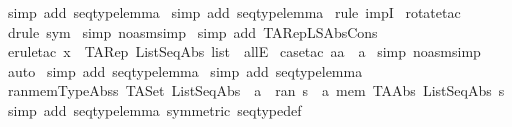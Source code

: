 \begin{isabellebody}
\ {\isacharparenleft}simp\ add{\isacharcolon}\ seqtype{\isacharunderscore}lemma{\isacharparenright}\isanewline
{}\isamarkupfalse%
\ {\isacharparenleft}simp\ add{\isacharcolon}\ seqtype{\isacharunderscore}lemma{\isacharparenright}\isanewline
{}\isamarkupfalse%
\ {\isacharparenleft}rule\ impI{\isacharparenright}\isanewline
{}\isamarkupfalse%
\ {\isacharparenleft}rotate{\isacharunderscore}tac\ {\isacharminus}{}{\isacharparenright}\isanewline
{}\isamarkupfalse%
\ {\isacharparenleft}drule\ sym{\isacharparenright}\isanewline
{}\isamarkupfalse%
\ {\isacharparenleft}simp\ {\isacharparenleft}no{\isacharunderscore}asm{\isacharunderscore}simp{\isacharparenright}{\isacharparenright}\isanewline
{}\isamarkupfalse%
\ {\isacharparenleft}simp\ add{\isacharcolon}\ TARep{\isacharunderscore}LSAbs{\isacharunderscore}Cons{\isacharparenright}\isanewline
{}\isamarkupfalse%
\ {\isacharparenleft}erule{\isacharunderscore}tac\ x\ {\isacharequal}\ {\isachardoublequoteopen}TARep\ ListSeqAbs\ list{\isachardoublequoteclose}\ \ allE{\isacharparenright}\isanewline
{}\isamarkupfalse%
\ {\isacharparenleft}case{\isacharunderscore}tac\ {\isachardoublequoteopen}aa\ {\isacharequal}\ a{\isachardoublequoteclose}{\isacharparenright}\isanewline
{}\isamarkupfalse%
\ {\isacharparenleft}simp\ {\isacharparenleft}no{\isacharunderscore}asm{\isacharunderscore}simp{\isacharparenright}{\isacharparenright}\isanewline
{}\isamarkupfalse%
\ auto\isanewline
{}\isamarkupfalse%
\ {\isacharparenleft}simp\ add{\isacharcolon}\ seqtype{\isacharunderscore}lemma{\isacharparenright}\isanewline
{}\isamarkupfalse%
\ {\isacharparenleft}simp\ add{\isacharcolon}\ seqtype{\isacharunderscore}lemma{\isacharparenright}\isanewline
{}\isamarkupfalse%
%
\endisatagproof
{\isafoldproof}%
%
\isadelimproof
\isanewline
%
\endisadelimproof
\isanewline
{}\isamarkupfalse%
\ ran{\isacharunderscore}mem{\isacharunderscore}TypeAbs{\isacharcolon}{\isachardoublequoteopen}s{\isacharcolon}\ TASet\ ListSeqAbs\ {\isacharequal}{\isacharequal}{\isachargreater}\ a\ {\isacharcolon}\ {\isacharparenleft}ran\ s{\isacharparenright}\ {\isacharequal}\ {\isacharparenleft}a\ mem\ {\isacharparenleft}TAAbs\ ListSeqAbs\ s{\isacharparenright}{\isacharparenright}{\isachardoublequoteclose}\isanewline
%
\isadelimproof
%
\endisadelimproof
%
\isatagproof
{}\isamarkupfalse%
\ {\isacharparenleft}simp\ add{\isacharcolon}\ seqtype{\isacharunderscore}lemma\ {\isacharbrackleft}symmetric{\isacharbrackright}\ seqtype{\isacharunderscore}def{\isacharparenright}\isanewline

\end{isabellebody}

